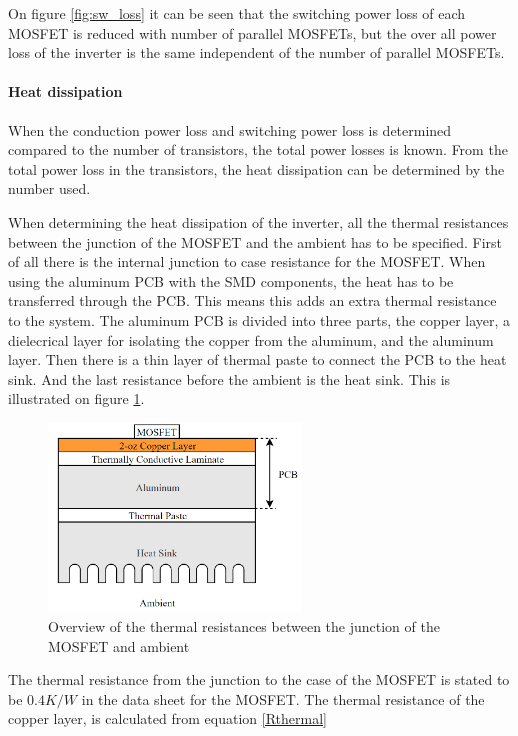 On figure \ref{fig:sw_loss} it can be seen that the switching power loss of each MOSFET is reduced with number of parallel MOSFETs, but the over all power loss of the inverter is the same independent of the number of parallel MOSFETs.

\paragraph{Heat dissipation}
When the conduction power loss and switching power loss is determined compared to the number of transistors, the total power losses is known. From the total power loss in the transistors, the heat dissipation can be determined by the number used.

When determining the heat dissipation of the inverter, all the thermal resistances between the junction of the MOSFET and the ambient has to be specified.
First of all there is the internal junction to case resistance for the MOSFET.
When using the aluminum PCB with the SMD components, the heat has to be transferred through the PCB. This means this adds an extra thermal resistance to the system. The aluminum PCB is divided into three parts, the copper layer, a dielecrical layer for isolating the copper from the aluminum, and the aluminum layer.
Then there is a thin layer of thermal paste to connect the PCB to the heat sink. And the last resistance before the ambient is the heat sink. This is illustrated on figure \ref{fig:thermal_overview}.

    \begin{figure}[H]
		\centering
		\includegraphics[width=0.6\textwidth]{pictures/hardware/Power_Board/Thermal_overview.png}
		\caption{Overview of the thermal resistances between the junction of the MOSFET and ambient}
		\label{fig:thermal_overview}
	\end{figure}
	
The thermal resistance from the junction to the case of the MOSFET is stated to be $0.4 K/W$ in the data sheet for the MOSFET.\cite{mosfet}
The thermal resistance of the copper layer, is calculated from equation \ref{Rthermal}

